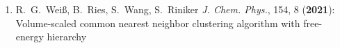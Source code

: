 \begin{enumerate}
\\
    \item R.\ G.\ Wei\ss, B.\ Ries, S.\ Wang, S.\ Riniker {\em J. Chem. Phys.}, 154, 8 ({\bf 2021}):
Volume-scaled common nearest neighbor clustering algorithm with free-energy hierarchy 
\\
\end{enumerate}
